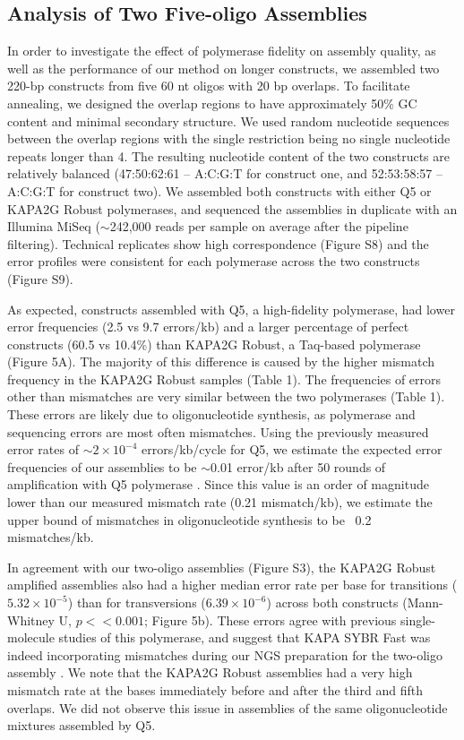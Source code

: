 \documentclass[twocolumn]{article}
\begin{document}

\subsection*{Analysis of Two Five-oligo Assemblies}
In order to investigate the effect of polymerase fidelity on assembly quality, as well as the performance of our method on longer constructs, we assembled two 220-bp constructs from five 60 nt oligos with 20 bp overlaps. To facilitate annealing, we designed the overlap regions to have approximately 50\% GC content and minimal secondary structure. We used random nucleotide sequences between the overlap regions with the single restriction being no single nucleotide repeats longer than 4. The resulting nucleotide content of the two constructs are relatively balanced (47:50:62:61 – A:C:G:T for construct one, and 52:53:58:57 – A:C:G:T for construct two). We assembled both constructs with either Q5 or KAPA2G Robust polymerases, and sequenced the assemblies in duplicate with an Illumina MiSeq ($\sim$242,000 reads per sample on average after the pipeline filtering). Technical replicates show high correspondence (Figure S8) and the error profiles were consistent for each polymerase across the two constructs (Figure S9).

As expected, constructs assembled with Q5, a high-fidelity polymerase, had lower error frequencies (2.5 vs 9.7 errors/kb) and a larger percentage of perfect constructs (60.5 vs 10.4\%) than KAPA2G Robust, a Taq-based polymerase (Figure 5A). The majority of this difference is caused by the higher mismatch frequency in the KAPA2G Robust samples (Table 1). The frequencies of errors other than mismatches are very similar between the two polymerases (Table 1). These errors are likely due to oligonucleotide synthesis, as polymerase and sequencing errors are most often mismatches. Using the previously measured error rates of $\sim2\times10^{-4}$ errors/kb/cycle for Q5, we estimate the expected error frequencies of our assemblies to be $\sim$0.01 error/kb after 50 rounds of amplification with Q5 polymerase \cite{potapov2017}. Since this value is an order of magnitude lower than our measured mismatch rate (0.21 mismatch/kb), we estimate the upper bound of mismatches in oligonucleotide synthesis to be ~0.2 mismatches/kb.

In agreement with our two-oligo assemblies (Figure S3), the KAPA2G Robust amplified assemblies also had a higher median error rate per base for transitions ($5.32\times10^{-5}$) than for transversions ($6.39\times10^{-6}$) across both constructs (Mann-Whitney U, $p<<0.001$; Figure 5b). These errors agree with previous single-molecule studies of this polymerase, and suggest that KAPA SYBR Fast was indeed incorporating mismatches during our NGS preparation for the two-oligo assembly \cite{hestand2016,potapov2017}. We note that the KAPA2G Robust assemblies had a very high mismatch rate at the bases immediately before and after the third and fifth overlaps. We did not observe this issue in assemblies of the same oligonucleotide mixtures assembled by Q5.
\end{document}
